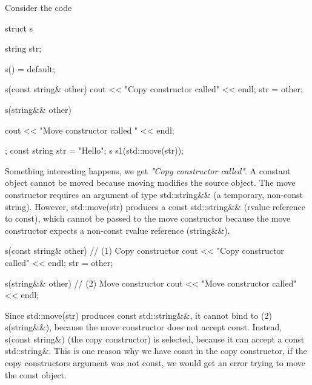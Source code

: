 \documentclass{report}
\begin{document}
    \pagebreak 
    \bigbreak \noindent 
    Consider the code
    \bigbreak \noindent 
    \begin{cppcode}
        struct s {
            string str{};

            s() = default;

            s(const string& other) {
                cout << "Copy constructor called" << endl;
                str = other;
            }

            s(string&& other) {
                cout << "Move constructor called " << endl;

            }
        };
        const string str = "Hello";
        s s1(std::move(str));
    \end{cppcode}
    \bigbreak \noindent 
    Something interesting happens, we get \textit{"Copy constructor called"}. A constant object cannot be moved because moving modifies the source object.
    \bigbreak \noindent 
    The move constructor requires an argument of type std::string\&\& (a temporary, non-const string).
    \bigbreak \noindent 
    However, std::move(str) produces a const std::string\&\& (rvalue reference to const), which cannot be passed to the move constructor because the move constructor expects a non-const rvalue reference (string\&\&).
    \bigbreak \noindent 
    \begin{cppcode}
        s(const string& other) {   // (1) Copy constructor
            cout << "Copy constructor called" << endl;
            str = other;
        }

        s(string&& other) {        // (2) Move constructor
            cout << "Move constructor called" << endl;
        }
    \end{cppcode}
    \bigbreak \noindent 
    Since std::move(str) produces const std::string\&\&, it cannot bind to (2) s(string\&\&), because the move constructor does not accept const.
    \bigbreak \noindent 
    Instead, s(const string\&) (the copy constructor) is selected, because it can accept a const std::string\&.
    \bigbreak \noindent 
    This is one reason why we have const in the copy constructor, if the copy constructors argument was not const, we would get an error trying to move the const object.

    \pagebreak 
\end{document}
